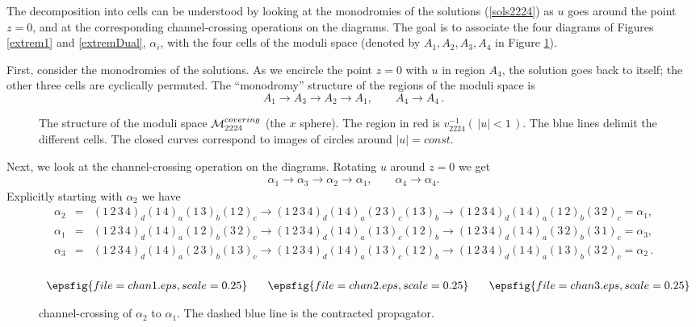 \documentclass[letterpaper]{JHEP3}
\def\a{\alpha}
\def\be{\begin{equation}}
\def\ee{\end{equation}}
\def\a{\alpha}
\def\be{\begin{eqnarray}}
\def\ee{\end{eqnarray}}
\begin{document}
 
 The decomposition into cells can be understood  by looking at the monodromies of the solutions
(\ref{sols2224}) as $u$ goes around the point $z=0$, and at the corresponding 
channel-crossing operations on the diagrams. 
The goal is to associate  the four diagrams of Figures \ref{extrem1} and \ref{extremDual}, $\a_i$, with the four cells
of the moduli space (denoted by $A_1,A_2, A_3, A_4$ in Figure \ref{moduli2224FF}). 

First, consider the monodromies of the solutions. As  we encircle the point  $z=0$ with $u$
in region $A_4$, the solution goes back to itself; the other three cells are cyclically
permuted.  The ``monodromy'' structure of the regions of the moduli space is
\begin{equation} \label{mon}
A_1\to A_3\to A_2\to A_1,\qquad A_4\to A_4 \,.
\end{equation}
\begin{figure}[htbp]
\begin{center}
\caption{The structure of the moduli space ${\cal M}^{covering}_{2224}$
 (the $x$ sphere). The region in red is $v_{2224}^{-1} (\,|u|<1\,)$.
The blue lines delimit the different cells. The closed curves correspond to images of circles around $|u| = const$. 
} \label{moduli2224FF}
\end{center}
\end{figure} 
Next, we look at the channel-crossing operation on the diagrams.
Rotating $u$ around $z=0$ we get 
\be \label{diagrammon}
\a_1\to \a_3\to \a_2\to \a_1,\qquad \a_4\to\a_4.
\ee Explicitly starting with $\a_2$ we have
\be
\a_2&=&(1\,2\,3\,4)_d(1\,4)_a(1\,3)_b(1\,2)_c \to(1\,2\,3\,4)_d(1\,4)_a(2\,3)_c(1\,3)_b\to
(1\,2\,3\,4)_d(1\,4)_a(1\,2)_b(3\,2)_c=\a_1,\nonumber\\
\a_1&=&(1\,2\,3\,4)_d(1\,4)_a(1\,2)_b(3\,2)_c \to(1\,2\,3\,4)_d(1\,4)_a(1\,3)_c(1\,2)_b\to
(1\,2\,3\,4)_d(1\,4)_a(3\,2)_b(3\,1)_c=\a_3,\nonumber\\
\a_3&=&(1\,2\,3\,4)_d(1\,4)_a(2\,3)_b(1\,3)_c \to(1\,2\,3\,4)_d(1\,4)_a(1\,3)_c(1\,2)_b\to
(1\,2\,3\,4)_d(1\,4)_a(1\,3)_b(3\,2)_c=\a_2 \,.\nonumber\\ 
\ee
\begin{figure}[htbp]
\begin{center}
$\begin{array}{c@{\hspace{0.25in}}c@{\hspace{0.25in}}c}
 \epsfig{file=chan1.eps,scale=0.25} & \epsfig{file=chan2.eps,scale=0.25}&\epsfig{file=chan3.eps,scale=0.25}\\
\end{array}$
\end{center}
\caption{channel-crossing of $\a_2$ to $\a_1$. The dashed blue line is the contracted propagator.} \label{chan2224} 
\end{figure}
\end{document}
